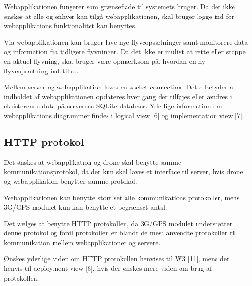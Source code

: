 Webapplikationen fungerer som grænseflade til systemets bruger. Da det ikke ønskes at alle og enhver kan tilgå webapplikationen, skal bruger logge ind før webapplikations funktionalitet kan benyttes. 

Via webapplikationen kan bruger lave nye flyveopsætninger samt monitorere data og information fra tidligere flyvninger. Da det ikke er muligt at rette eller stoppe en aktuel flyvning, skal bruger være opmærksom på, hvordan en ny flyveopsætning indstilles. 

Mellem server og webapplikation laves en socket connection. Dette betyder at indholdet af webapplikationen opdateres hver gang der tilføjes eller ændres i eksisterende data på serverens SQLite database. Yderlige information om webapplikations diagrammer findes i logical view [6] og implementation view [7].


\subsection{HTTP protokol}

Det ønskes at webapplikation og drone skal benytte samme kommunikationsprotokol, da der kun skal laves et interface til server, hvis drone og webapplikation benytter samme protokol.



Webapplikationen kan benytte stort set alle kommunikations protokoller, mens 3G/GPS modulet kun kan benytte et begrænset antal.

Det vælges at benytte HTTP protokollen, da 3G/GPS modulet understøtter denne protokol og fordi protokollen er blandt de mest anvendte protokoller til kommunikation mellem webapplikationer og servere.

Ønskes yderlige viden om HTTP protokollen henvises til W3 [11], mens der henvis til deployment view [8], hvis der ønskes mere viden om brug af protokollen. 
